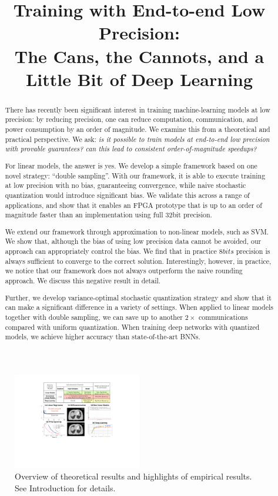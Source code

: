 \documentclass{article}
\date{}
\title{Training with End-to-end Low Precision:\\
The Cans, the Cannots, and a Little Bit of Deep Learning
}
\begin{document}
\maketitle

\begin{abstract}

There has recently been significant interest in training 
machine-learning models at low precision: by reducing 
precision, one can reduce computation, communication, and power 
consumption by an order of magnitude. 
We examine this from a theoretical and practical 
perspective. We ask: 
{\em is it possible to \emph{train} models at end-to-end low 
precision with \emph{provable} guarantees?  can this 
lead to consistent order-of-magnitude speedups?}

For linear models, the answer is yes. We develop a simple 
framework based on one novel strategy: ``double sampling''. 
With our framework, it is able 
to execute training at low precision with no bias, 
guaranteeing convergence, while naive stochastic quantization 
would introduce significant bias. We validate this  
across a range of applications, and show that it enables an 
FPGA prototype that is up to an order of magnitude faster 
than an implementation using full 32bit precision.

We extend our framework through approximation to non-linear 
models, such as SVM. We show that, although the bias of using 
low precision data cannot be avoided, our approach can appropriately 
control the bias. We find that in practice $8bits$ precision is 
always sufficient to converge to the correct solution. 
Interestingly, however, in practice, we notice that our framework 
does not always outperform the naive rounding approach. We discuss 
this negative result in detail. 

Further, we develop variance-optimal 
stochastic quantization
strategy and show that 
it can make a significant difference in a variety of settings. 
When applied to linear models together with 
double sampling, we can save up to another 
$2\times$ communications
compared with uniform quantization. When
training deep networks with quantized models, 
we achieve higher accuracy than state-of-the-art BNNs. 

\end{abstract}

\begin{figure}[t]
\centering
\includegraphics[width=0.5\textwidth]{Figures/RSHighlight}    
\vspace{-2em}
\caption{Overview of theoretical results and
highlights of empirical results. See
Introduction for details.}
\label{fig:highlight}
\end{figure}
\vspace{-2em}
\end{document}
